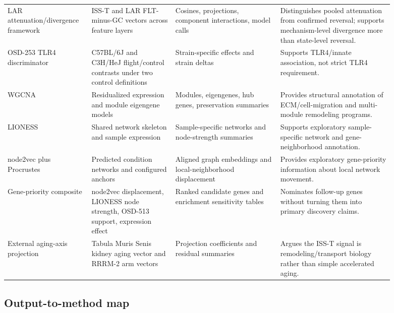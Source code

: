 \documentclass[11pt]{article}
\begin{document}
\begin{landscape}
\begin{longtable}{p{0.17\linewidth}p{0.20\linewidth}p{0.25\linewidth}p{0.27\linewidth}}
LAR attenuation/divergence framework & ISS-T and LAR FLT-minus-GC vectors across feature layers & Cosines, projections, component interactions, model calls & Distinguishes pooled attenuation from confirmed reversal; supports mechanism-level divergence more than state-level reversal. \\
OSD-253 TLR4 discriminator & C57BL/6J and C3H/HeJ flight/control contrasts under two control definitions & Strain-specific effects and strain deltas & Supports TLR4/innate association, not strict TLR4 requirement. \\
WGCNA & Residualized expression and module eigengene models & Modules, eigengenes, hub genes, preservation summaries & Provides structural annotation of ECM/cell-migration and multi-module remodeling programs. \\
LIONESS & Shared network skeleton and sample expression & Sample-specific networks and node-strength summaries & Supports exploratory sample-specific network and gene-neighborhood annotation. \\
node2vec plus Procrustes & Predicted condition networks and configured anchors & Aligned graph embeddings and local-neighborhood displacement & Provides exploratory gene-priority information about local network movement. \\
Gene-priority composite & node2vec displacement, LIONESS node strength, OSD-513 support, expression effect & Ranked candidate genes and enrichment sensitivity tables & Nominates follow-up genes without turning them into primary discovery claims. \\
External aging-axis projection & Tabula Muris Senis kidney aging vector and RRRM-2 arm vectors & Projection coefficients and residual summaries & Argues the ISS-T signal is remodeling/transport biology rather than simple accelerated aging. \\
\bottomrule
\end{longtable}
\normalsize
\end{landscape}

\subsection{Output-to-method map}
\end{document}
